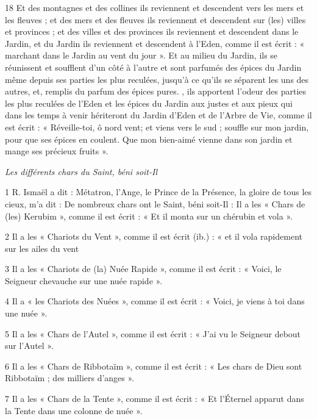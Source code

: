 \par 18 Et des montagnes et des collines ils reviennent et descendent vers les mers et les fleuves ; et des mers et des fleuves ils reviennent et descendent sur (les) villes et provinces ; et des villes et des provinces ils reviennent et descendent dans le Jardin, et du Jardin ils reviennent et descendent à l'Eden, comme il est écrit : « marchant dans le Jardin au vent du jour ». Et au milieu du Jardin, ils se réunissent et soufflent d'un côté à l'autre et sont parfumés des épices du Jardin même depuis ses parties les plus reculées, jusqu'à ce qu'ils se séparent les uns des autres, et, remplis du parfum des épices pures. , ils apportent l'odeur des parties les plus reculées de l'Eden et les épices du Jardin aux justes et aux pieux qui dans les temps à venir hériteront du Jardin d'Eden et de l'Arbre de Vie, comme il est écrit : « Réveille-toi, ô nord vent; et viens vers le sud ; souffle sur mon jardin, pour que ses épices en coulent. Que mon bien-aimé vienne dans son jardin et mange ses précieux fruits ».


\par \textit{Les différents chars du Saint, béni soit-Il}

\par 1 R. Ismaël a dit : Métatron, l'Ange, le Prince de la Présence, la gloire de tous les cieux, m'a dit : De nombreux chars ont le Saint, béni soit-Il : Il a les « Chars de (les) Kerubim », comme il est écrit : « Et il monta sur un chérubin et vola ».

\par 2 Il a les « Chariots du Vent », comme il est écrit (ib.) : « et il vola rapidement sur les ailes du vent

\par 3 Il a les « Chariots de (la) Nuée Rapide », comme il est écrit : « Voici, le Seigneur chevauche sur une nuée rapide ».

\par 4 Il a « les Chariots des Nuées », comme il est écrit : « Voici, je viens à toi dans une nuée ».

\par 5 Il a les « Chars de l'Autel », comme il est écrit : « J'ai vu le Seigneur debout sur l'Autel ».

\par 6 Il a les « Chars de Ribbotaïm », comme il est écrit : « Les chars de Dieu sont Ribbotaïm ; des milliers d'anges ».

\par 7 Il a les « Chars de la Tente », comme il est écrit : « Et l'Éternel apparut dans la Tente dans une colonne de nuée ».

